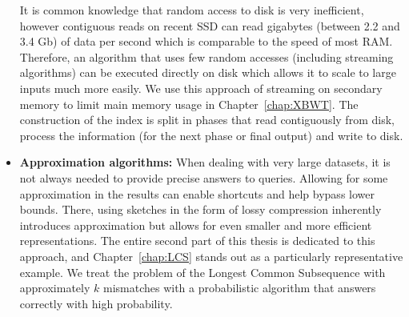 \begin{itemize}
It is  common knowledge that random access to disk is very inefficient, however contiguous reads on recent SSD can read gigabytes (between 2.2 and 3.4 Gb) of data per second which is comparable to the speed of most RAM. %
Therefore, an algorithm that uses few random accesses (including streaming algorithms) can be executed directly on disk which allows it to scale to large inputs much more easily. 
We use this approach of streaming on secondary memory to limit main memory usage in Chapter~\ref{chap:XBWT}. The construction of the index is split in phases that read contiguously from disk, process the information (for the next phase or final output) and write to disk.
%
\item \textbf{Approximation algorithms:} When dealing with very large datasets, it is not always needed to provide precise answers to queries. Allowing for some approximation in the results can enable shortcuts and help bypass lower bounds. There, using sketches in the form of lossy compression inherently introduces approximation but allows for even smaller and more efficient representations.
The entire second part of this thesis is dedicated to this approach, and Chapter~\ref{chap:LCS} stands out as a particularly representative example. We treat the problem of the Longest Common Subsequence with approximately $k$ mismatches with a probabilistic algorithm that answers correctly with high probability.
\end{itemize}

